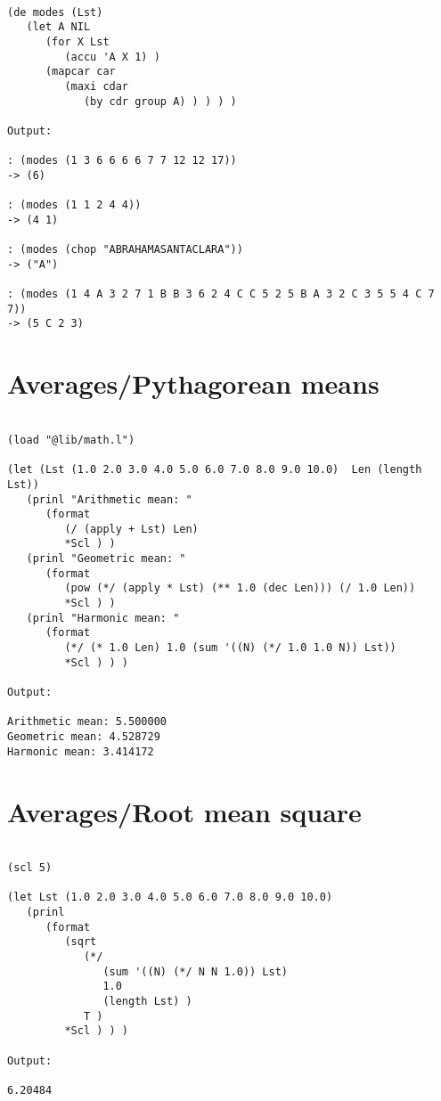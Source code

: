 \begin{verbatim}

(de modes (Lst)
   (let A NIL
      (for X Lst
         (accu 'A X 1) )
      (mapcar car
         (maxi cdar
            (by cdr group A) ) ) ) )

Output:

: (modes (1 3 6 6 6 6 7 7 12 12 17))
-> (6)

: (modes (1 1 2 4 4))
-> (4 1)

: (modes (chop "ABRAHAMASANTACLARA"))
-> ("A")

: (modes (1 4 A 3 2 7 1 B B 3 6 2 4 C C 5 2 5 B A 3 2 C 3 5 5 4 C 7 7))
-> (5 C 2 3)

\end{verbatim}

\section*{Averages/Pythagorean means}

\begin{verbatim}

(load "@lib/math.l")

(let (Lst (1.0 2.0 3.0 4.0 5.0 6.0 7.0 8.0 9.0 10.0)  Len (length Lst))
   (prinl "Arithmetic mean: "
      (format
         (/ (apply + Lst) Len)
         *Scl ) )
   (prinl "Geometric mean: "
      (format
         (pow (*/ (apply * Lst) (** 1.0 (dec Len))) (/ 1.0 Len))
         *Scl ) )
   (prinl "Harmonic mean: "
      (format
         (*/ (* 1.0 Len) 1.0 (sum '((N) (*/ 1.0 1.0 N)) Lst))
         *Scl ) ) )

Output:

Arithmetic mean: 5.500000
Geometric mean: 4.528729
Harmonic mean: 3.414172

\end{verbatim}

\section*{Averages/Root mean square}

\begin{verbatim}

(scl 5)

(let Lst (1.0 2.0 3.0 4.0 5.0 6.0 7.0 8.0 9.0 10.0)
   (prinl
      (format
         (sqrt
            (*/
               (sum '((N) (*/ N N 1.0)) Lst)
               1.0
               (length Lst) )
            T )
         *Scl ) ) )

Output:

6.20484

\end{verbatim}

